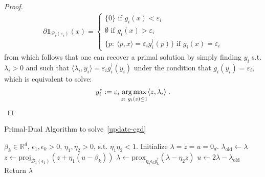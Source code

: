 \begin{proof}
\begin{align*}
\partial\bm{1}_{\mathcal{B}_i(\varepsilon_i)}(x)=\begin{cases} 
          \{0\}\text{ if } g_i(x)< \varepsilon_i\\
          \emptyset \text{ if } g_i(x)> \varepsilon_i\\
          \{p:~\langle p, x\rangle =\varepsilon_ig_i^{\dagger}(p)\} \text{ if } g_i(x)=\varepsilon_i
       \end{cases}
\end{align*}
from which follows that one can recover a primal solution by simply finding $y_i$ s.t. $\lambda_i>0$ and such that $\langle \lambda_i, y_i\rangle=\varepsilon_ig_i^{\dagger}(y_i)$ under the condition that $g_i(y_i)=\varepsilon_i$, which is equivalent to solve:
\begin{align*}
    y_i^{*}:=\varepsilon_i\operatorname*{arg\,max}_{z:~g_i(z)\leq 1} \langle z,\lambda_i\rangle \; .
\end{align*}
\end{proof}


\begin{algorithm}[tb]
   \caption{Primal-Dual Algorithm to solve~\eqref{update-cgd}}
   \label{alg:primal-dual}
\begin{algorithmic}
    $\beta_k\in\mathbb{R}^d$,   $\epsilon_1,\epsilon_k>0$, $\eta_1, \eta_2>0$, s.t. $\eta_1\eta_2<1$.
   \STATE Initialize $\lambda=z=u=0_d$.
   \STATE $\lambda_{\text{old}} \gets \lambda$
    \STATE $z\gets \text{proj}_{\mathcal{B}_{1}(\epsilon_1)}(z + \eta_1 (u - \beta_k)) $
    \STATE $\lambda\gets \text{prox}_{\eta_2\epsilon_k g_k^{\dagger}}(\lambda - \eta_2 z)$
    \STATE $u\gets 2\lambda - \lambda_{\text{old}}$
   \ENDFOR
   \STATE Return $\lambda$
\end{algorithmic}
\end{algorithm}


